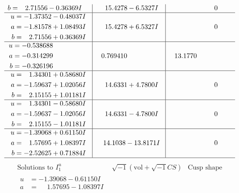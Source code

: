 \documentclass[1p]{elsarticle_modified}
\theoremstyle{definition}
\newcommand{\I}{\sqrt{-1}}
\begin{document}
$$\begin{array}{c|c|c}
\begin{aligned}
b &= \phantom{-}2.71556 - 0.36369 I\end{aligned}
 & \phantom{-}15.4278 - 6.5327 I & \phantom{-0.000000 } 0 \\ \hline\begin{aligned}
u &= -1.37352 - 0.48037 I \\
a &= -1.81578 + 1.08493 I \\
b &= \phantom{-}2.71556 + 0.36369 I\end{aligned}
 & \phantom{-}15.4278 + 6.5327 I & \phantom{-0.000000 } 0 \\ \hline\begin{aligned}
u &= -0.538688\phantom{ +0.000000I} \\
a &= -0.314299\phantom{ +0.000000I} \\
b &= -0.326196\phantom{ +0.000000I}\end{aligned}
 & \phantom{-}0.769410\phantom{ +0.000000I} & \phantom{-}13.1770\phantom{ +0.000000I} \\ \hline\begin{aligned}
u &= \phantom{-}1.34301 + 0.58680 I \\
a &= -1.59637 + 1.02056 I \\
b &= \phantom{-}2.15155 + 1.01181 I\end{aligned}
 & \phantom{-}14.6331 + 4.7800 I & \phantom{-0.000000 } 0 \\ \hline\begin{aligned}
u &= \phantom{-}1.34301 - 0.58680 I \\
a &= -1.59637 - 1.02056 I \\
b &= \phantom{-}2.15155 - 1.01181 I\end{aligned}
 & \phantom{-}14.6331 - 4.7800 I & \phantom{-0.000000 } 0 \\ \hline\begin{aligned}
u &= -1.39068 + 0.61150 I \\
a &= \phantom{-}1.57695 + 1.08397 I \\
b &= -2.52625 + 0.71884 I\end{aligned}
 & \phantom{-}14.1038 - 13.8171 I & \phantom{-0.000000 } 0\\
 \hline 
 \end{array}$$\newpage$$\begin{array}{c|c|c}  
\text{Solutions to }I^u_{1}& \I (\text{vol} + \sqrt{-1}CS) & \text{Cusp shape}\\
 \hline 
\begin{aligned}
u &= -1.39068 - 0.61150 I \\
a &= \phantom{-}1.57695 - 1.08397 I \\

\end{aligned}
\end{array}$$
\end{document}

